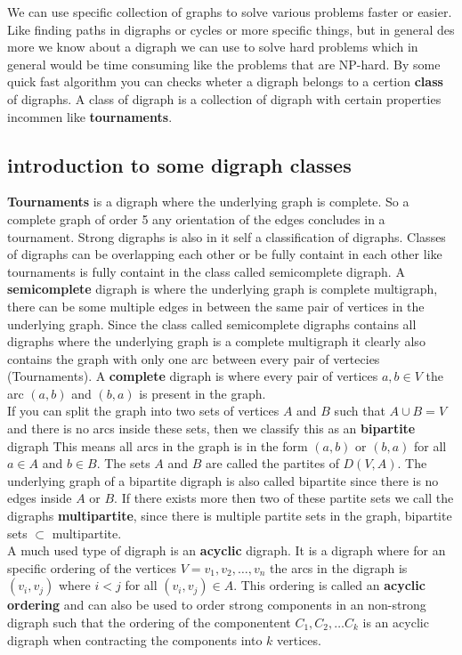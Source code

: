 We can use specific collection of graphs to solve various problems faster or easier. 
Like finding paths in digraphs or cycles or more specific things, but in general des more we know about a digraph we can use to solve hard problems which in general would be time consuming like the problems that are NP-hard.
By some quick fast algorithm you can checks wheter a digraph belongs to a certion \textbf{class} of digraphs. 
A class of digraph is a collection of digraph with certain properties incommen like \textbf{tournaments}.\\
\subsection{introduction to some digraph classes}
\textbf{Tournaments} is a digraph where the underlying graph is complete. 
So a complete graph of order 5 any orientation of the edges concludes in a tournament.
Strong digraphs is also in it self a classification of digraphs. Classes of digraphs can be overlapping each other or be fully containt in each other like tournaments is fully containt in the class called semicomplete digraph.
A \textbf{semicomplete} digraph is where the underlying graph is complete multigraph, there can be some multiple edges in between the same pair of vertices in the underlying graph. Since the class called semicomplete digraphs contains all digraphs where the underlying graph is a complete multigraph it clearly also contains the graph with only one arc between every pair of vertecies (Tournaments).
A \textbf{complete} digraph is where every pair of vertices $a,b\in V$ the arc $(a,b)$ and $(b,a)$ is present in the graph. \\
If you can split the graph into two sets of vertices $A$ and $B$ such that $A\cup B=V$ and there is no arcs inside these sets, then we classify this as an \textbf{bipartite} digraph This means all arcs in the graph is in the form $(a,b)$ or $(b,a)$ for all $a\in A$ and $b\in B$. 
The sets $A$ and $B$ are called the partites of $D(V,A)$. 
The underlying graph of a bipartite digraph is also called bipartite since there is no edges inside $A$ or $B$.
If there exists more then two of these partite sets we call the digraphs \textbf{multipartite}, since there is multiple partite sets in the graph, bipartite sets $\subset$ multipartite. \\
A much used type of digraph is an \textbf{acyclic} digraph. 
It is a digraph where for an specific ordering of the vertices $V={v_1, v_2,\dots , v_n}$ the arcs in the digraph is $(v_i, v_j)$ where $i<j$ for all $(v_i, v_j)\in A$. This ordering is called an \textbf{acyclic ordering} and can also be used to order strong components in an non-strong digraph such that the ordering of the componentent $C_1,C_2,\dots C_k$ is an acyclic digraph when contracting the components into $k$ vertices. 
